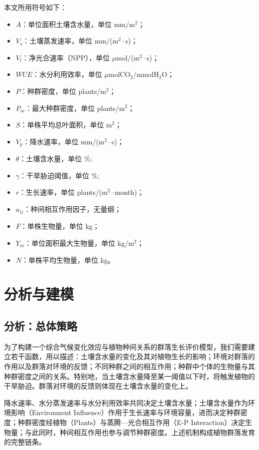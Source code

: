 \documentclass[11pt,a4paper]{ctexart}
\begin{document}
本文所用符号如下：
\begin{itemize}
\item $A$：单位面积土壤含水量，单位 mm/m$^2$；
\item $V_s$：土壤蒸发速率，单位 mm/(m$^2\cdot$s)；
\item $V_l$：净光合速率（NPP），单位 $\mu$mol/(m$^2\cdot$s)；
\item $WUE$：水分利用效率，单位 $\mu$molCO$_2$/mmolH$_2$O；
\item $P$：种群密度，单位 plants/m$^2$；
\item $P_m$：最大种群密度，单位 plants/m$^2$；
\item $S$：单株平均总叶面积，单位 m$^2$；
\item $V_p$：降水速率，单位 mm/(m$^2\cdot$s)；
\item $\theta$：土壤含水量，单位 \%;
\item $\gamma$：干旱胁迫阈值，单位 \%;
\item $r$：生长速率，单位 plants/(m$^2\cdot$month)；
\item $a_{ij}$：种间相互作用因子，无量纲；
\item $F$：单株生物量，单位 kg；
\item $Y_m$：单位面积最大生物量，单位 kg/m$^2$；
\item $N$：单株平均生物量，单位 kg。
\end{itemize}

\section{分析与建模}

\subsection{分析：总体策略}

为了构建一个综合气候变化效应与植物种间关系的群落生长评价模型，我们需要建立若干函数，用以描述：土壤含水量的变化及其对植物生长的影响；环境对群落的作用以及群落对环境的反馈；不同种群之间的相互作用；种群中个体的生物量与其种群密度之间的关系。特别地，当土壤含水量降至某一阈值以下时，将触发植物的干旱胁迫。群落对环境的反馈则体现在土壤含水量的变化上。

降水速率、水分蒸发速率与水分利用效率共同决定土壤含水量；土壤含水量作为环境影响（Environment Influence）作用于生长速率与环境容量，进而决定种群密度；种群密度经植物（Plants）与蒸腾—光合相互作用（E-P Interaction）决定生物量；与此同时，种间相互作用也参与调节种群密度。上述机制构成植物群落发育的完整链条。
\end{document}
